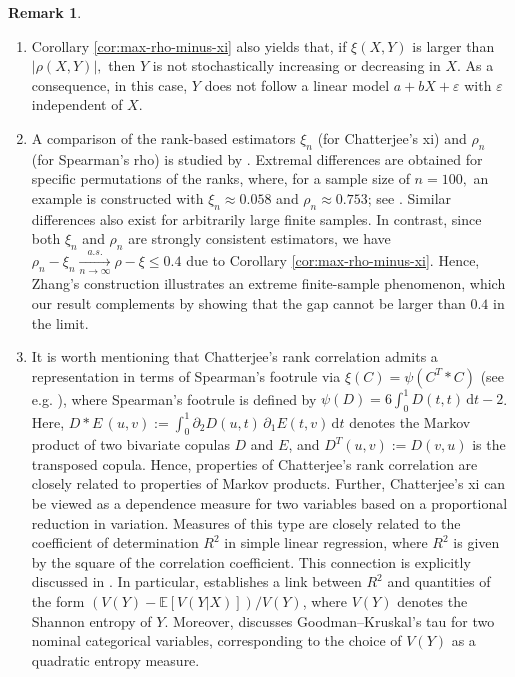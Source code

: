 \documentclass{article}
\theoremstyle{plain}
\theoremstyle{definition}
\newtheorem{remark}{Remark}
\newcommand{\de}{\mathrm{\,d}}
\begin{document}
\begin{remark}
\begin{enumerate}[label=(\alph*)]
We therefore focus on \(\xi\) and document the substantial differences between the values of \(\xi\) and \(\rho\) in our work.
    \item Corollary \ref{cor:max-rho-minus-xi} also yields that, if \(\xi(X,Y)\) is larger than \(|\rho(X,Y)|,\) then \(Y\) is not stochastically increasing or decreasing in \(X.\) As a consequence, in this case, \(Y\) does not follow a linear model \(a + bX + \varepsilon\) with \(\varepsilon\) independent of \(X.\)
    \item A comparison of the rank-based estimators $\xi_n$ (for Chatterjee's xi) and $\rho_n$ (for Spearman's rho) is studied by \cite{Zhang-2025}. Extremal differences are obtained for specific permutations of the ranks, where, for a sample size of $n = 100,$ an example is constructed with $\xi_n \approx 0.058$ and $\rho_n \approx 0.753$; see \cite[Extremal case 2]{Zhang-2025}. Similar differences also exist for arbitrarily large finite samples.
    In contrast, since both $\xi_n$ and $\rho_n$ are strongly consistent estimators, we have \(\rho_n-\xi_n \xrightarrow[n\to\infty]{a.s.} \rho-\xi \leq 0.4\) due to Corollary \ref{cor:max-rho-minus-xi}. Hence, Zhang’s construction illustrates an extreme finite-sample phenomenon, which our result complements by showing that the gap cannot be larger than $0.4$ in the limit. 
    \item \label{remmainF} It is worth mentioning that Chatterjee's rank correlation admits a representation in terms of Spearman's footrule via \(\xi(C) = \psi(C^T\ast C)\) (see e.g. \cite{fuchs2021quantifying}), where Spearman's footrule is defined by \(\psi(D) = 6 \int_0^1 D(t,t) \de t-2\). 
    Here, \(D\ast E\,(u,v) := \int_0^1 \partial_2 D(u,t)\, \partial_1 E(t,v)\de t\) denotes the Markov product of two bivariate copulas \(D\) and \(E\), and \(D^T(u,v) := D(v,u)\) is the transposed copula. Hence, properties of Chatterjee’s rank correlation are closely related to properties of Markov products.
    Further, Chatterjee’s xi can be viewed as a dependence measure for two variables based on a proportional reduction in variation.
Measures of this type are closely related to the coefficient of determination \(R^2\) in simple linear regression, where \(R^2\) is given by the square of the correlation coefficient.
This connection is explicitly discussed in \cite{Shih-2021,Shih-Emura-2025}.
In particular, \cite[Section~2.4.3]{Agresti-2013} establishes a link between \(R^2\) and quantities of the form
\((V(Y) - \mathbb{E}[V(Y | X)])/V(Y)\), where \(V(Y)\) denotes the Shannon entropy of \(Y\).
Moreover, \cite[Exercise~2.39]{Agresti-2013} discusses Goodman--Kruskal’s tau for two nominal categorical variables, corresponding to the choice of \(V(Y)\) as a quadratic entropy measure.
\end{enumerate}
\end{remark}
\end{document}
